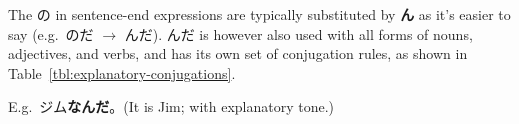 \documentclass[../nihongo-gakushuu-kyouzai.tex]{subfiles}
\begin{document}
\begin{itemize}
\begin{description}
        The の in sentence-end expressions are typically substituted by \textbf{ん} as it's easier to say (e.g.\ のだ $\to$ んだ). んだ is however also used with all forms of nouns, adjectives, and verbs, and has its own set of conjugation rules, as shown in Table~\ref{tbl:explanatory-conjugations}.

        E.g.\ ジム\textbf{なんだ}。(It is Jim; with explanatory tone.)
    \end{description}
\end{itemize}

\end{document}
